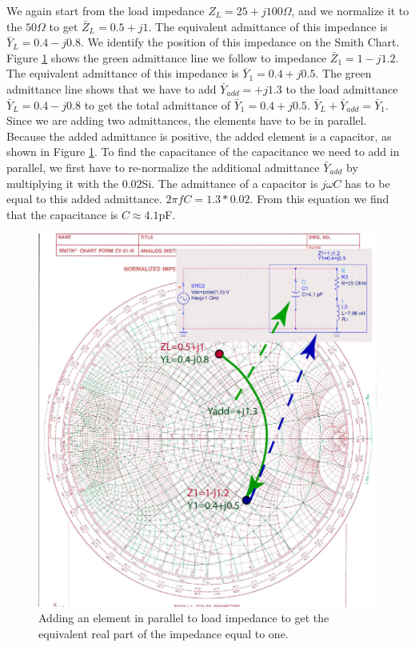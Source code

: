 \documentclass{ximera}
\begin{document}
We again start from the load impedance  $Z_L=25+j 100 \Omega$, and we normalize it to the $50 \Omega$ to get $\bar{Z}_L=0.5+j1$. The equivalent admittance of this impedance is $\bar{Y}_L=0.4-j0.8$. We identify the position of this impedance on the Smith Chart. Figure \ref{fig:LumpedImpM1} shows the green admittance line we follow to impedance $\bar{Z}_1=1-j1.2$. The equivalent admittance of this impedance is   $\bar{Y}_1=0.4+j0.5$. The green admittance line shows that we have to add $\bar{Y}_{add}=+j1.3$ to the load admittance $\bar{Y}_L=0.4-j0.8$ to get the total admittance of $\bar{Y}_1=0.4+j0.5$. $\bar{Y}_L+\bar{Y}_{add}=\bar{Y}_1$. Since we are adding two admittances, the elements have to be in parallel. Because the added admittance is positive, the added element is a capacitor, as shown in Figure \ref{fig:LumpedImpM1}. To find the capacitance of the capacitance we need to add in parallel, we first have to re-normalize the additional admittance $\bar{Y}_{add}$ by multiplying it with the $0.02$Si. The admittance of a capacitor is $j \omega C$ has to be equal to this added admittance. $2 \pi f C = 1.3* 0.02$. From this equation we find that the capacitance is $C \approx 4.1$pF. 
 


\begin{figure}[htbp]
\begin{center}
\includegraphics[scale=1]{../jpg/LumpedMatch2-01.jpg}
\end{center}
\caption{Adding an element in parallel to load impedance to get the equivalent real part of the impedance equal to one.}
\label{fig:LumpedImpM1}
\end{figure}
\end{document}
